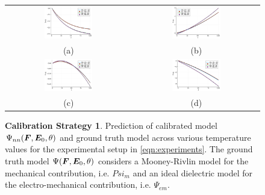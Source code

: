 \begin{figure}[hbtp]
	\centering
	\begin{tabular}{cc}
		\includegraphics[width=0.4\textwidth]{Figures/PotentialStudy/_PhysicalExperiments_MooneyRivlin_ID_E0_D1} &
		\includegraphics[width=0.4\textwidth]{Figures/PotentialStudy/_PhysicalExperiments_MooneyRivlin_ID_E0_F11}  \\
		(a)  &  (b)\\
		\includegraphics[width=0.4\textwidth]{Figures/PotentialStudy/_PhysicalExperiments_MooneyRivlin_ID_E0_F12} &
		\includegraphics[width=0.4\textwidth]{Figures/PotentialStudy/_PhysicalExperiments_MooneyRivlin_ID_E0_F33}  \\
		(c)  &  (d)		
	\end{tabular}
	\caption{\textbf{Calibration Strategy 1}. Prediction of calibrated model $\Psi_{nn}(\boldsymbol{F}, \boldsymbol{E}_0, \theta)$ and ground truth model across various temperature values for the experimental setup in \eqref{eqn:experiments}. The ground truth model $\Psi(\boldsymbol{F},\boldsymbol{E}_0,\theta)$ considers a Mooney-Rivlin model for the mechanical contribution, i.e. $Psi_{m}$ and an ideal dielectric model for the electro-mechanical contribution, i.e. $\Psi_{em}$.}
	\label{fig:physical experiments}
\end{figure}


